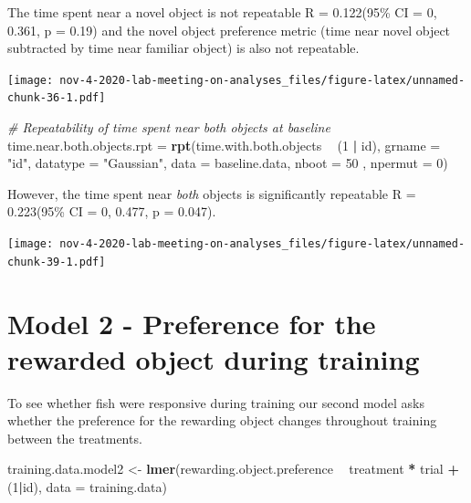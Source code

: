 \documentclass[]{book}
\newenvironment{Shaded}{\begin{snugshade}}{\end{snugshade}}
\newcommand{\KeywordTok}[1]{\textcolor[rgb]{0.13,0.29,0.53}{\textbf{#1}}}
\newcommand{\DataTypeTok}[1]{\textcolor[rgb]{0.13,0.29,0.53}{#1}}
\newcommand{\DecValTok}[1]{\textcolor[rgb]{0.00,0.00,0.81}{#1}}
\newcommand{\StringTok}[1]{\textcolor[rgb]{0.31,0.60,0.02}{#1}}
\newcommand{\CommentTok}[1]{\textcolor[rgb]{0.56,0.35,0.01}{\textit{#1}}}
\newcommand{\OperatorTok}[1]{\textcolor[rgb]{0.81,0.36,0.00}{\textbf{#1}}}
\newcommand{\NormalTok}[1]{#1}
\begin{document}
The time spent near a novel object is not repeatable R = 0.122(95\% CI =
0, 0.361, p = 0.19) and the novel object preference metric (time near
novel object subtracted by time near familiar object) is also not
repeatable.

\texttt{[image: nov-4-2020-lab-meeting-on-analyses\_files/figure-latex/unnamed-chunk-36-1.pdf]}

\begin{Shaded}
\begin{Highlighting}[]
\CommentTok{# Repeatability of time spent near both objects at baseline }
\NormalTok{time.near.both.objects.rpt =}\StringTok{ }
\StringTok{  }\KeywordTok{rpt}\NormalTok{(time.with.both.objects }\OperatorTok{~}\StringTok{ }\NormalTok{(}\DecValTok{1} \OperatorTok{|}\StringTok{ }\NormalTok{id), }\DataTypeTok{grname =} \StringTok{"id"}\NormalTok{, }\DataTypeTok{datatype =} \StringTok{"Gaussian"}\NormalTok{,}
      \DataTypeTok{data =}\NormalTok{ baseline.data, }\DataTypeTok{nboot =} \DecValTok{50}\NormalTok{ , }\DataTypeTok{npermut =} \DecValTok{0}\NormalTok{) }
\end{Highlighting}
\end{Shaded}

However, the time spent near \emph{both} objects is significantly
repeatable R = 0.223(95\% CI = 0, 0.477, p = 0.047).

\texttt{[image: nov-4-2020-lab-meeting-on-analyses\_files/figure-latex/unnamed-chunk-39-1.pdf]}

\chapter{Model 2 - Preference for the rewarded object during
training}\label{model-2---preference-for-the-rewarded-object-during-training}

To see whether fish were responsive during training our second model
asks whether the preference for the rewarding object changes throughout
training between the treatments.

\begin{Shaded}
\begin{Highlighting}[]
\NormalTok{training.data.model2 <-}\StringTok{ }
\StringTok{  }\KeywordTok{lmer}\NormalTok{(rewarding.object.preference }\OperatorTok{~}\StringTok{ }\NormalTok{treatment }\OperatorTok{*}\StringTok{ }\NormalTok{trial }\OperatorTok{+}\StringTok{ }\NormalTok{(}\DecValTok{1}\OperatorTok{|}\NormalTok{id), }
       \DataTypeTok{data =}\NormalTok{ training.data)}
\end{Highlighting}
\end{Shaded}
\end{document}
